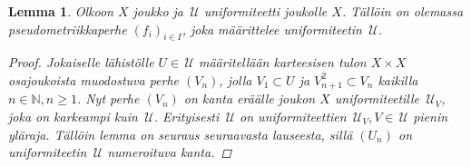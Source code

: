 \documentclass[12pt,a4paper,leqno]{report}
\newcommand{\N}{\mathbb{N}}
\newcommand{\U}{\,\mathcal{U}}
\theoremstyle{plain}
\newtheorem{lem}[equation]{Lemma}
\theoremstyle{definition}
\theoremstyle{remark}
\begin{document}
\begin{lem}\label{pseudo_uniformista}
Olkoon $X$ joukko ja $\U$ uniformiteetti joukolle $X$. 
Tällöin on olemassa pseudometriikkaperhe $(f_i)_{i\in I}$, joka määrittelee uniformiteetin $\U$.
\begin{proof}
Jokaiselle lähistölle $U\in\U$ määritellään karteesisen tulon $X\times X$ osajoukoista muodostuva perhe $(V_n)$, 
jolla $V_1\subset U$ ja $V_{n+1}^2\subset V_n$ kaikilla $n\in\N, n\geq 1$. 
Nyt perhe $(V_n)$ on kanta eräälle joukon $X$ uniformiteetille $\U_V$, 
joka on karkeampi kuin $\U$. 
Erityisesti $\U$ on uniformiteettien 
$\U_V,V\in\U$ pienin yläraja. %
Tällöin lemma on seuraus seuraavasta lauseesta, sillä 
$(U_n)$ on uniformiteetin $\U$ numeroituva kanta.
\end{proof}
\end{lem}
\end{document}
